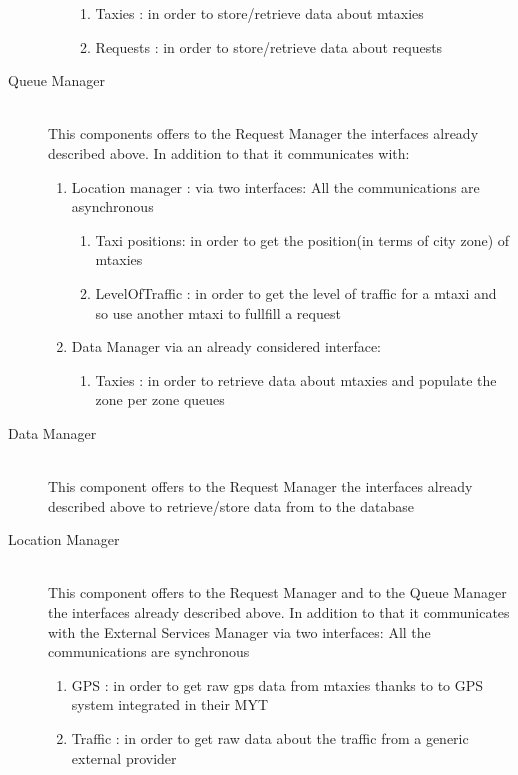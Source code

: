 \documentclass[11pt,titlepage]{article} %
\begin{document}
\begin{description}
\begin{enumerate}
\begin{enumerate}
	               \item Taxies : in order to store/retrieve data about mtaxies
	               \item Requests : in order to store/retrieve data about requests
		\end{enumerate}
     \end{enumerate}
      \item [Queue Manager] \hfill \\
          This components offers to the Request Manager the interfaces already described above. In addition to that
          it communicates with:
	\begin{enumerate}
	          \item Location manager : via two interfaces:\newline
		All the communications are asynchronous
		\begin{enumerate}
		            \item Taxi positions: in order to get the position(in terms of city zone) of mtaxies
		            \item LevelOfTraffic : in order to get the level of traffic for a mtaxi and so use another mtaxi
		            to fullfill a request
		\end{enumerate}
	          \item Data Manager via an already considered interface:
		\begin{enumerate}
	           	\item Taxies : in order to retrieve data about mtaxies and populate the zone per zone queues
		\end{enumerate}
	\end{enumerate}

       \item [Data Manager] \hfill \\
          This component offers to the Request Manager the interfaces already described above to retrieve/store data
          from to the database

      \item [Location Manager] \hfill \\
          This component offers to the Request Manager and to the Queue Manager the interfaces already described above. In addition to that it communicates
          with the External Services Manager via two interfaces:\newline
	All the communications are synchronous
	\begin{enumerate}
	          \item GPS : in order to get raw gps data from mtaxies thanks to to GPS system integrated in their MYT
	          \item Traffic : in order to get raw data about the traffic from a generic external provider
	\end{enumerate}


\end{description}
\end{document}
